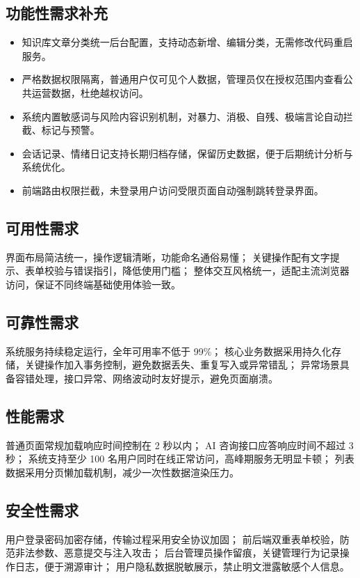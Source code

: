 \subsection{功能性需求补充}
\begin{itemize}
    \item 知识库文章分类统一后台配置，支持动态新增、编辑分类，无需修改代码重启服务。
    \item 严格数据权限隔离，普通用户仅可见个人数据，管理员仅在授权范围内查看公共运营数据，杜绝越权访问。
    \item 系统内置敏感词与风险内容识别机制，对暴力、消极、自残、极端言论自动拦截、标记与预警。
    \item 会话记录、情绪日记支持长期归档存储，保留历史数据，便于后期统计分析与系统优化。
    \item 前端路由权限拦截，未登录用户访问受限页面自动强制跳转登录界面。
\end{itemize}

\subsection{可用性需求}
界面布局简洁统一，操作逻辑清晰，功能命名通俗易懂；
关键操作配有文字提示、表单校验与错误指引，降低使用门槛；
整体交互风格统一，适配主流浏览器访问，保证不同终端基础使用体验一致。

\subsection{可靠性需求}
系统服务持续稳定运行，全年可用率不低于 99\%；
核心业务数据采用持久化存储，关键操作加入事务控制，避免数据丢失、重复写入或异常错乱；
异常场景具备容错处理，接口异常、网络波动时友好提示，避免页面崩溃。

\subsection{性能需求}
普通页面常规加载响应时间控制在 2 秒以内；
AI 咨询接口应答响应时间不超过 3 秒；
系统支持至少 100 名用户同时在线正常访问，高峰期服务无明显卡顿；
列表数据采用分页懒加载机制，减少一次性数据渲染压力。

\subsection{安全性需求}
用户登录密码加密存储，传输过程采用安全协议加固；
前后端双重表单校验，防范非法参数、恶意提交与注入攻击；
后台管理员操作留痕，关键管理行为记录操作日志，便于溯源审计；
用户隐私数据脱敏展示，禁止明文泄露敏感个人信息。

